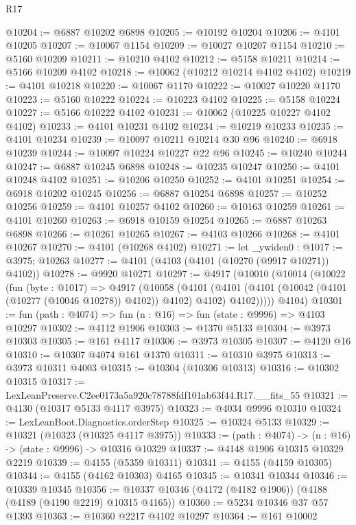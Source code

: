 \begin{lexlean}{R17}
\begin{coremodule}
@10204 := @6887 @10202 @6898
@10205 := @10192 @10204
@10206 := @4101 @10205
@10207 := @10067 @1154
@10209 := @10027 @10207 @1154
@10210 := @5160 @10209
@10211 := @10210 @4102
@10212 := @5158 @10211
@10214 := @5166 @10209 @4102
@10218 := @10062 (@10212 @10214 @4102 @4102)
@10219 := @4101 @10218
@10220 := @10067 @1170
@10222 := @10027 @10220 @1170
@10223 := @5160 @10222
@10224 := @10223 @4102
@10225 := @5158 @10224
@10227 := @5166 @10222 @4102
@10231 := @10062 (@10225 @10227 @4102 @4102)
@10233 := @4101 @10231 @4102
@10234 := @10219 @10233
@10235 := @4101 @10234
@10239 := @10097 @10211 @10214 @30 @96
@10240 := @6918 @10239
@10244 := @10097 @10224 @10227 @22 @96
@10245 := @10240 @10244
@10247 := @6887 @10245 @6898
@10248 := @10235 @10247
@10250 := @4101 @10248 @4102
@10251 := @10206 @10250
@10252 := @4101 @10251
@10254 := @6918 @10202 @10245
@10256 := @6887 @10254 @6898
@10257 := @10252 @10256
@10259 := @4101 @10257 @4102
@10260 := @10163 @10259
@10261 := @4101 @10260
@10263 := @6918 @10159 @10254
@10265 := @6887 @10263 @6898
@10266 := @10261 @10265
@10267 := @4103 @10266
@10268 := @4101 @10267
@10270 := @4101 (@10268 @4102)
@10271 := let _ywiden0 : @1017 := @3975; @10263
@10277 := @4101 (@4103 (@4101 (@10270 (@9917 @10271)) @4102))
@10278 := @9920 @10271
@10297 := @4917
    (@10010
      (@10014
        (@10022
          (fun (byte : @1017) =>
          @4917
            (@10058
              (@4101
                (@4101 (@4101 (@10042 (@4101 (@10277 (@10046 @10278)) @4102)) @4102) @4102)
                @4102)))))
      @4104)
@10301 := fun (path : @4074) => fun (n : @16) => fun (state : @9996) => @4103 @10297
@10302 := @4112 @1906
@10303 := @1370 @5133
@10304 := @3973 @10303
@10305 := @161 @4117
@10306 := @3973 @10305
@10307 := @4120 @16
@10310 := @10307 @4074 @161 @1370
@10311 := @10310 @3975
@10313 := @3973 @10311 @4003
@10315 := @10304 (@10306 @10313)
@10316 := @10302 @10315
@10317 := LexLeanPreserve.C2ee0173a5a920c78788fdf101ab63f44.R17.__fits_55
@10321 := @4130 (@10317 @5133 @4117 @3975)
@10323 := @4034 @9996 @10310
@10324 := LexLeanBoot.Diagnostics.orderStep
@10325 := @10324 @5133
@10329 := @10321 (@10323 (@10325 @4117 @3975))
@10333 := (path : @4074) -> (n : @16) -> (state : @9996) -> @10316 @10329
@10337 := @4148 @1906 @10315 @10329 @2219
@10339 := @4155 (@5359 @10311)
@10341 := @4155 (@4159 @10305)
@10344 := @4155 (@4162 @10303) @4165
@10345 := @10341 @10344
@10346 := @10339 @10345
@10356 := @10337 @10346 (@4172 (@4182 @1906)) (@4188 (@4189 (@4190 @2219) @10315 @4165))
@10360 := @5234 @10346 @37 @57 @1393
@10363 := @10360 @2217 @4102 @10297
@10364 := @161 @10002

\end{coremodule}
\end{lexlean}
